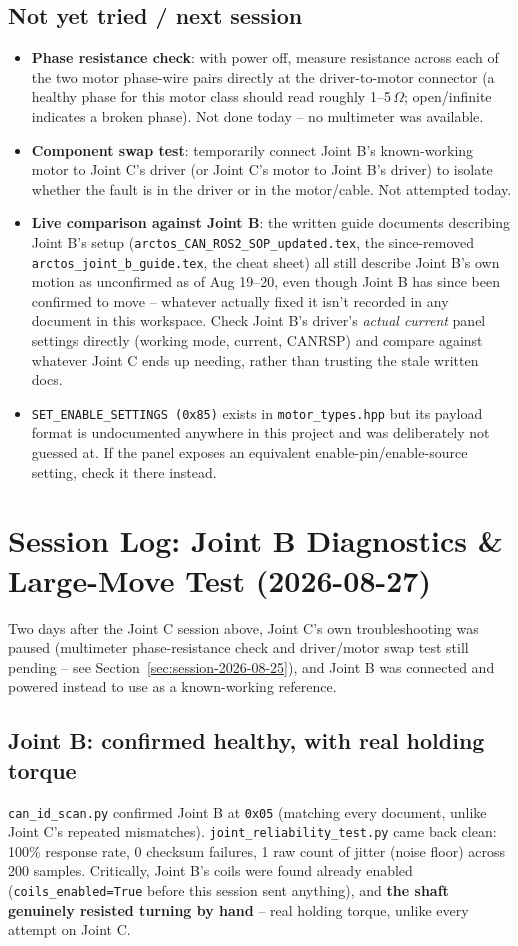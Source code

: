 \documentclass[11pt,letterpaper]{article}
\begin{document}
\subsection{Not yet tried / next session}
\begin{itemize}
    \item \textbf{Phase resistance check}: with power off, measure resistance across each of the two motor phase-wire pairs directly at the driver-to-motor connector (a healthy phase for this motor class should read roughly 1--5\,$\Omega$; open/infinite indicates a broken phase). Not done today -- no multimeter was available.
    \item \textbf{Component swap test}: temporarily connect Joint B's known-working motor to Joint C's driver (or Joint C's motor to Joint B's driver) to isolate whether the fault is in the driver or in the motor/cable. Not attempted today.
    \item \textbf{Live comparison against Joint B}: the written guide documents describing Joint B's setup (\texttt{arctos\_CAN\_ROS2\_SOP\_updated.tex}, the since-removed \texttt{arctos\_joint\_b\_guide.tex}, the cheat sheet) all still describe Joint B's own motion as unconfirmed as of Aug 19--20, even though Joint B has since been confirmed to move -- whatever actually fixed it isn't recorded in any document in this workspace. Check Joint B's driver's \emph{actual current} panel settings directly (working mode, current, CANRSP) and compare against whatever Joint C ends up needing, rather than trusting the stale written docs.
    \item \texttt{SET\_ENABLE\_SETTINGS (0x85)} exists in \texttt{motor\_types.hpp} but its payload format is undocumented anywhere in this project and was deliberately not guessed at. If the panel exposes an equivalent enable-pin/enable-source setting, check it there instead.
\end{itemize}

\section{Session Log: Joint B Diagnostics \& Large-Move Test (2026-08-27)}
\label{sec:session-2026-08-27}
Two days after the Joint C session above, Joint C's own troubleshooting was paused (multimeter phase-resistance check and driver/motor swap test still pending -- see Section~\ref{sec:session-2026-08-25}), and Joint B was connected and powered instead to use as a known-working reference.

\subsection{Joint B: confirmed healthy, with real holding torque}
\texttt{can\_id\_scan.py} confirmed Joint B at \texttt{0x05} (matching every document, unlike Joint C's repeated mismatches). \texttt{joint\_reliability\_test.py} came back clean: 100\% response rate, 0 checksum failures, 1 raw count of jitter (noise floor) across 200 samples. Critically, Joint B's coils were found already enabled (\texttt{coils\_enabled=True} before this session sent anything), and \textbf{the shaft genuinely resisted turning by hand} -- real holding torque, unlike every attempt on Joint C.
\end{document}
